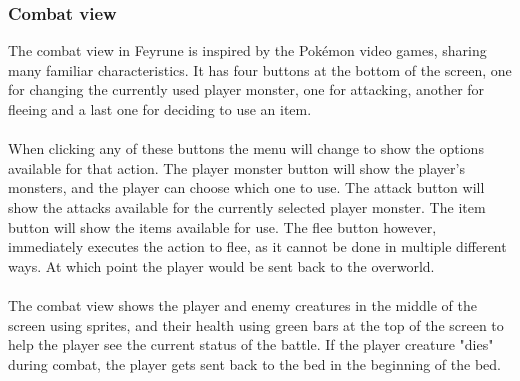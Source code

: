 \subsubsection{Combat view}
The combat view in Feyrune is inspired by the Pokémon video games, sharing many familiar characteristics. It has four buttons at the bottom of the screen, one for changing the currently used player monster, one for attacking, another for fleeing and a last one for deciding to use an item.\\
\\
When clicking any of these buttons the menu will change to show the options available for that action. The player monster button will show the player's monsters, and the player can choose which one to use. The attack button will show the attacks available for the currently selected player monster. The item button will show the items available for use. The flee button however, immediately executes the action to flee, as it cannot be done in multiple different ways. At which point the player would be sent back to the overworld.\\
\\
The combat view shows the player and enemy creatures in the middle of the screen using sprites, and their health using green bars at the top of the screen to help the player see the current status of the battle. If the player creature "dies" during combat, the player gets sent back to the bed in the beginning of the bed.\\
